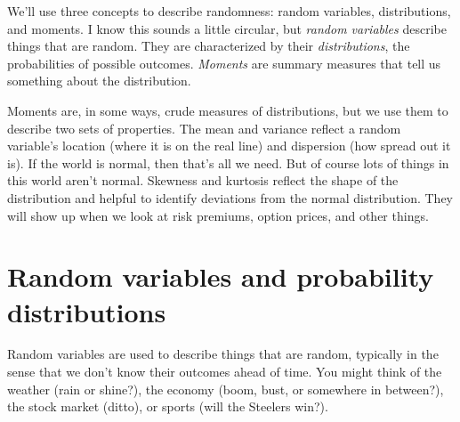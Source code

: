 We'll use three concepts to describe randomness:  random variables, distributions, and moments.
I know this sounds a little circular, but {\it random variables\/} describe things that are random.
They are characterized by their {\it distributions\/},
the probabilities of possible outcomes.
{\it Moments\/} are summary measures that tell us something about
the distribution.

Moments are, in some ways, crude measures of distributions,
but we use them to describe two sets of properties.
The mean and variance reflect a random variable's
location (where it is on the real line)
and dispersion (how spread out it is).
If the world is normal, then that's all we need.
But of course lots of things in this world aren't normal.
Skewness and kurtosis reflect the shape of the distribution
and helpful to identify deviations from the normal distribution.
They will show up when we look at risk premiums, option prices,
and other things.


\section{Random variables and probability distributions}

Random variables are used to describe things that are random,
typically in the sense that we don't know their outcomes ahead of time.
You might think of the weather (rain or shine?),
the economy (boom, bust, or somewhere in between?),
the stock market (ditto),
or sports (will the Steelers win?).

